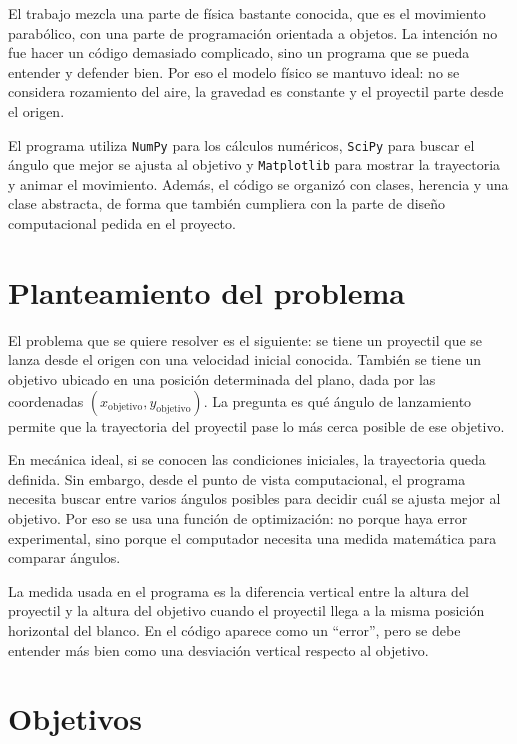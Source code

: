 \documentclass[12pt,letterpaper]{article}
\begin{document}
El trabajo mezcla una parte de f\'{i}sica bastante conocida, que es el movimiento parab\'{o}lico, con una parte de programaci\'{o}n orientada a objetos. La intenci\'{o}n no fue hacer un c\'{o}digo demasiado complicado, sino un programa que se pueda entender y defender bien. Por eso el modelo f\'{i}sico se mantuvo ideal: no se considera rozamiento del aire, la gravedad es constante y el proyectil parte desde el origen.

El programa utiliza \texttt{NumPy} para los c\'{a}lculos num\'{e}ricos, \texttt{SciPy} para buscar el \'{a}ngulo que mejor se ajusta al objetivo y \texttt{Matplotlib} para mostrar la trayectoria y animar el movimiento. Adem\'{a}s, el c\'{o}digo se organiz\'{o} con clases, herencia y una clase abstracta, de forma que tambi\'{e}n cumpliera con la parte de dise\~{n}o computacional pedida en el proyecto.

\section{Planteamiento del problema}

El problema que se quiere resolver es el siguiente: se tiene un proyectil que se lanza desde el origen con una velocidad inicial conocida. Tambi\'{e}n se tiene un objetivo ubicado en una posici\'{o}n determinada del plano, dada por las coordenadas \((x_{\text{objetivo}}, y_{\text{objetivo}})\). La pregunta es qu\'{e} \'{a}ngulo de lanzamiento permite que la trayectoria del proyectil pase lo m\'{a}s cerca posible de ese objetivo.

En mec\'{a}nica ideal, si se conocen las condiciones iniciales, la trayectoria queda definida. Sin embargo, desde el punto de vista computacional, el programa necesita buscar entre varios \'{a}ngulos posibles para decidir cu\'{a}l se ajusta mejor al objetivo. Por eso se usa una funci\'{o}n de optimizaci\'{o}n: no porque haya error experimental, sino porque el computador necesita una medida matem\'{a}tica para comparar \'{a}ngulos.

La medida usada en el programa es la diferencia vertical entre la altura del proyectil y la altura del objetivo cuando el proyectil llega a la misma posici\'{o}n horizontal del blanco. En el c\'{o}digo aparece como un ``error'', pero se debe entender m\'{a}s bien como una desviaci\'{o}n vertical respecto al objetivo.

\section{Objetivos}
\end{document}
